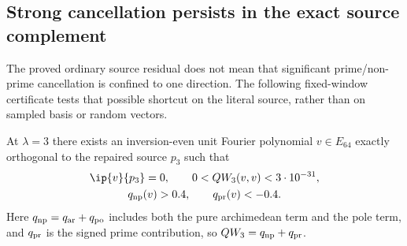\subsection*{Strong cancellation persists in the exact source complement}

The proved ordinary source residual does not mean that significant
prime/non-prime cancellation is confined to one direction. The following
fixed-window certificate tests that possible shortcut on the literal
source, rather than on sampled basis or random vectors.

\begin{proposition}
\label{prop:v121-complement-cancellation}
At $\lambda=3$ there exists an inversion-even unit Fourier polynomial
$v\in E_{64}$ exactly orthogonal to the repaired source $p_3$ such that
\begin{equation}\label{eq:v121-complement-cancellation}
 \begin{gathered}
 \ip{v}{p_3}=0,\qquad
 0<QW_3(v,v)<3\cdot10^{-31},\\
 q_{\rm np}(v)>0.4,\qquad q_{\rm pr}(v)<-0.4.
 \end{gathered}
\end{equation}
Here $q_{\rm np}=q_{\rm ar}+q_{\rm po}$ includes both the pure
archimedean term and the pole term, and $q_{\rm pr}$ is the signed
prime contribution, so $QW_3=q_{\rm np}+q_{\rm pr}$.
\end{proposition}

